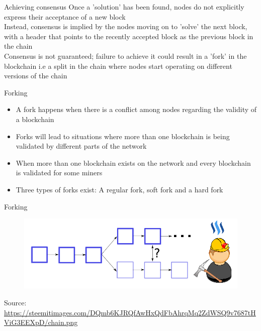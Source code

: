 \documentclass[10pt]{beamer}
\begin{document}

\begin{frame}{Achieving consensus}
	Once a 'solution' has been found, nodes do not explicitly express their acceptance of a new block\\ \vspace{3mm}
	Instead, consensus is implied by the nodes moving on to 'solve' the next block, with a header that points to the recently accepted block as the previous block in the chain\\ \vspace{3mm}
	Consensus is not guaranteed; failure to achieve it could result in a 'fork' in the blockchain i.e a split in the chain where nodes start operating on different versions of the chain
\end{frame}


\begin{frame}{Forking}
	\begin{itemize}
		\item A fork happens when there is a conflict among nodes regarding the validity of a blockchain
		\item Forks will lead to situations where more than one blockchain is being validated by different parts of the network
		\item When more than one blockchain exists on the network and every blockchain is validated for some miners
		\item Three types of forks exist: A regular fork, soft fork and a hard fork
	\end{itemize}
\end{frame}


\begin{frame}{Forking}
	\begin{figure}[]
		\centering
		\includegraphics  [scale=0.1]{Images/fork6}
	\end{figure}
	\begin{tiny}
		Source: \href{https://steemkr.com/blockchain/@rtrader/blockchain-split-soft-vs-hard-fork}{https://steemitimages.com/DQmb6KJRQfAwHxQdFbAhrqMq2ZdWSQ9v7687tHViG3EEXpD/chain.png}
	\end{tiny}
\end{frame}
\end{document}
